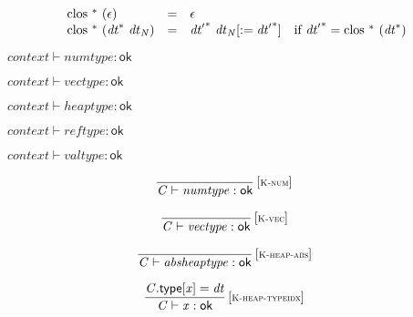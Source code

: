 $$
\begin{array}{@{}lcl@{}l@{}}
{\mathrm{clos}}~{}^\ast~(\epsilon) &=& \epsilon &  \\
{\mathrm{clos}}~{}^\ast~({{\mathit{dt}}^\ast}~{\mathit{dt}}_{{\mathit{N}}}) &=& {{\mathit{dt}'}^\ast}~{{\mathit{dt}}_{{\mathit{N}}}}{{}[{ := }\;{{\mathit{dt}'}^\ast}]} &\quad
  \mbox{if}~{{\mathit{dt}'}^\ast} = {\mathrm{clos}}~{}^\ast~({{\mathit{dt}}^\ast}) \\
\end{array}
$$

\vspace{1ex}

\vspace{1ex}

$\boxed{{\mathit{context}} \vdash {\mathit{numtype}} : \mathsf{ok}}$

$\boxed{{\mathit{context}} \vdash {\mathit{vectype}} : \mathsf{ok}}$

$\boxed{{\mathit{context}} \vdash {\mathit{heaptype}} : \mathsf{ok}}$

$\boxed{{\mathit{context}} \vdash {\mathit{reftype}} : \mathsf{ok}}$

$\boxed{{\mathit{context}} \vdash {\mathit{valtype}} : \mathsf{ok}}$

\vspace{1ex}

$$
\begin{array}{@{}c@{}}\displaystyle
\frac{
}{
{\mathit{C}} \vdash {\mathit{numtype}} : \mathsf{ok}
} \, {[\textsc{\scriptsize K{-}num}]}
\qquad
\end{array}
$$

$$
\begin{array}{@{}c@{}}\displaystyle
\frac{
}{
{\mathit{C}} \vdash {\mathit{vectype}} : \mathsf{ok}
} \, {[\textsc{\scriptsize K{-}vec}]}
\qquad
\end{array}
$$

$$
\begin{array}{@{}c@{}}\displaystyle
\frac{
}{
{\mathit{C}} \vdash {\mathit{absheaptype}} : \mathsf{ok}
} \, {[\textsc{\scriptsize K{-}heap{-}abs}]}
\qquad
\end{array}
$$

$$
\begin{array}{@{}c@{}}\displaystyle
\frac{
{\mathit{C}}.\mathsf{type}{}[{\mathit{x}}] = {\mathit{dt}}
}{
{\mathit{C}} \vdash {\mathit{x}} : \mathsf{ok}
} \, {[\textsc{\scriptsize K{-}heap{-}typeidx}]}
\qquad
\end{array}
$$

